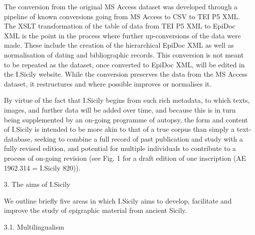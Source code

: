 \documentclass[amsthm,ebook]{saparticle}
\begin{document}
The conversion from the original MS Access dataset was developed through a pipeline of known conversions going from MS
Access to CSV to TEI P5 XML. The XSLT transformation of the table of data from TEI P5 XML to EpiDoc XML is the point in
the process where further up-conversions of the data were made. These include the creation of the hierarchical EpiDoc
XML as well as normalisation of dating and bibliographic records. This conversion is not meant to be repeated as the
dataset, once converted to EpiDoc XML, will be edited in the I.Sicily website. While the conversion preserves the data
from the MS Access dataset, it restructures and where possible improves or normalises it.

By virtue of the fact that I.Sicily begins from such rich metadata, to which texts, images, and further data will be
added over time, and because this is in turn being supplemented by an on-going programme of autopsy, the form and
content of I.Sicily is intended to be more akin to that of a true corpus than simply a text-database, seeking to
combine a full record of past publication and study with a fully revised edition, and potential for multiple
individuals to contribute to a process of on-going revision (see Fig. 1 for a draft edition of one inscription (AE
1962.314 = I.Sicily 820)).


\bigskip

3. The aims of I.Sicily

We outline briefly five areas in which I.Sicily aims to develop, facilitate and improve the study of epigraphic material
from ancient Sicily.


\bigskip

3.1. Multilingualism
\end{document}
